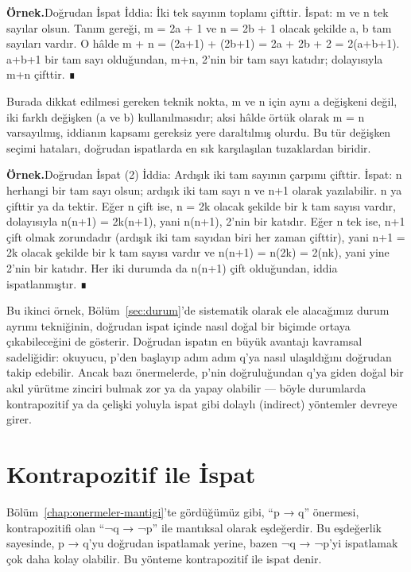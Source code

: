 \begin{tcolorbox}[bookbox,colback=cEx]\textbf{\textsf{\textcolor{cAcc}{Örnek.}}}\quad Doğrudan İspat İddia: İki tek sayının toplamı çifttir. İspat: m ve n tek sayılar olsun. Tanım gereği, m = 2a + 1 ve n = 2b + 1 olacak şekilde a, b tam sayıları vardır. O hâlde m + n = (2a+1) + (2b+1) = 2a + 2b + 2 = 2(a+b+1). a+b+1 bir tam sayı olduğundan, m+n, 2’nin bir tam sayı katıdır; dolayısıyla m+n çifttir. ∎\end{tcolorbox}

Burada dikkat edilmesi gereken teknik nokta, m ve n için aynı a değişkeni değil, iki farklı değişken (a ve b) kullanılmasıdır; aksi hâlde örtük olarak m = n varsayılmış, iddianın kapsamı gereksiz yere daraltılmış olurdu. Bu tür değişken seçimi hataları, doğrudan ispatlarda en sık karşılaşılan tuzaklardan biridir.

\begin{tcolorbox}[bookbox,colback=cEx]\textbf{\textsf{\textcolor{cAcc}{Örnek.}}}\quad Doğrudan İspat (2) İddia: Ardışık iki tam sayının çarpımı çifttir. İspat: n herhangi bir tam sayı olsun; ardışık iki tam sayı n ve n+1 olarak yazılabilir. n ya çifttir ya da tektir. Eğer n çift ise, n = 2k olacak şekilde bir k tam sayısı vardır, dolayısıyla n(n+1) = 2k(n+1), yani n(n+1), 2’nin bir katıdır. Eğer n tek ise, n+1 çift olmak zorundadır (ardışık iki tam sayıdan biri her zaman çifttir), yani n+1 = 2k olacak şekilde bir k tam sayısı vardır ve n(n+1) = n(2k) = 2(nk), yani yine 2’nin bir katıdır. Her iki durumda da n(n+1) çift olduğundan, iddia ispatlanmıştır. ∎\end{tcolorbox}

Bu ikinci örnek, Bölüm~\ref{sec:durum}’de sistematik olarak ele alacağımız durum ayrımı tekniğinin, doğrudan ispat içinde nasıl doğal bir biçimde ortaya çıkabileceğini de gösterir. Doğrudan ispatın en büyük avantajı kavramsal sadeliğidir: okuyucu, p’den başlayıp adım adım q’ya nasıl ulaşıldığını doğrudan takip edebilir. Ancak bazı önermelerde, p’nin doğruluğundan q’ya giden doğal bir akıl yürütme zinciri bulmak zor ya da yapay olabilir — böyle durumlarda kontrapozitif ya da çelişki yoluyla ispat gibi dolaylı (indirect) yöntemler devreye girer.

\section{Kontrapozitif ile İspat}

Bölüm~\ref{chap:onermeler-mantigi}’te gördüğümüz gibi, “p → q” önermesi, kontrapozitifi olan “¬q → ¬p” ile mantıksal olarak eşdeğerdir. Bu eşdeğerlik sayesinde, p → q’yu doğrudan ispatlamak yerine, bazen ¬q → ¬p’yi ispatlamak çok daha kolay olabilir. Bu yönteme kontrapozitif ile ispat denir.

